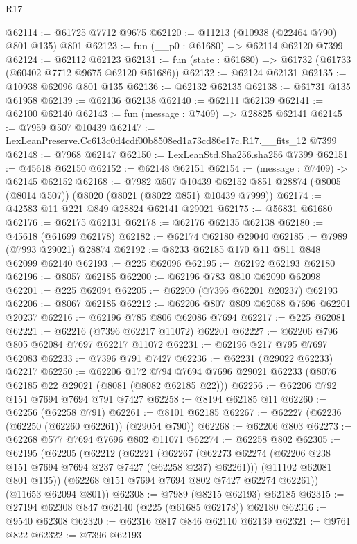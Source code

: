 \begin{lexlean}{R17}
\begin{coremodule}
@62114 := @61725 @7712 @9675
@62120 := @11213 (@10938 (@22464 @790) @801 @135) @801
@62123 := fun (__p0 : @61680) => @62114 @62120 @7399
@62124 := @62112 @62123
@62131 := fun (state : @61680) => @61732 (@61733 (@60402 @7712 @9675 @62120 @61686))
@62132 := @62124 @62131
@62135 := @10938 @62096 @801 @135
@62136 := @62132 @62135
@62138 := @61731 @135 @61958
@62139 := @62136 @62138
@62140 := @62111 @62139
@62141 := @62100 @62140
@62143 := fun (message : @7409) => @28825 @62141
@62145 := @7959 @507 @10439
@62147 := LexLeanPreserve.Cc613c0d4cdf00b8508ed1a73cd86e17c.R17.__fits_12 @7399
@62148 := @7968 @62147
@62150 := LexLeanStd.Sha256.sha256 @7399
@62151 := @45618 @62150
@62152 := @62148 @62151
@62154 := (message : @7409) -> @62145 @62152
@62168 := @7982
    @507
    @10439
    @62152
    @851
    @28874
    (@8005 (@8014 @507))
    (@8020 (@8021 (@8022 @851) @10439 @7999))
@62174 := @42583 @11 @221 @849 @28824 @62141 @29021
@62175 := @56831 @61680
@62176 := @62175 @62131
@62178 := @62176 @62135 @62138
@62180 := @45618 (@61699 @62178)
@62182 := @62174 @62180 @29040
@62185 := @7989 (@7993 @29021) @28874
@62192 := @8233 @62185 @170 @11 @811 @848 @62099 @62140
@62193 := @225 @62096
@62195 := @62192 @62193 @62180
@62196 := @8057 @62185
@62200 := @62196 @783 @810 @62090 @62098
@62201 := @225 @62094
@62205 := @62200 (@7396 @62201 @20237) @62193
@62206 := @8067 @62185
@62212 := @62206 @807 @809 @62088 @7696 @62201 @20237
@62216 := @62196 @785 @806 @62086 @7694
@62217 := @225 @62081
@62221 := @62216 (@7396 @62217 @11072) @62201
@62227 := @62206 @796 @805 @62084 @7697 @62217 @11072
@62231 := @62196 @217 @795 @7697 @62083
@62233 := @7396 @791 @7427
@62236 := @62231 (@29022 @62233) @62217
@62250 := @62206
    @172
    @794
    @7694
    @7696
    @29021
    @62233
    (@8076 @62185 @22 @29021 (@8081 (@8082 @62185 @22)))
@62256 := @62206 @792 @151 @7694 @7694 @791 @7427
@62258 := @8194 @62185 @11
@62260 := @62256 (@62258 @791)
@62261 := @8101 @62185
@62267 := @62227 (@62236 (@62250 (@62260 @62261)) (@29054 @790))
@62268 := @62206 @803
@62273 := @62268 @577 @7694 @7696 @802 @11071
@62274 := @62258 @802
@62305 := @62195
    (@62205
      (@62212
        (@62221
          (@62267 (@62273 @62274 (@62206 @238 @151 @7694 @7694 @237 @7427 (@62258 @237) @62261)))
          (@11102 @62081 @801 @135))
        (@62268 @151 @7694 @7694 @802 @7427 @62274 @62261))
      (@11653 @62094 @801))
@62308 := @7989 (@8215 @62193) @62185
@62315 := @27194 @62308 @847 @62140 (@225 (@61685 @62178)) @62180
@62316 := @9540 @62308
@62320 := @62316 @817 @846 @62110 @62139
@62321 := @9761 @822
@62322 := @7396 @62193

\end{coremodule}
\end{lexlean}

